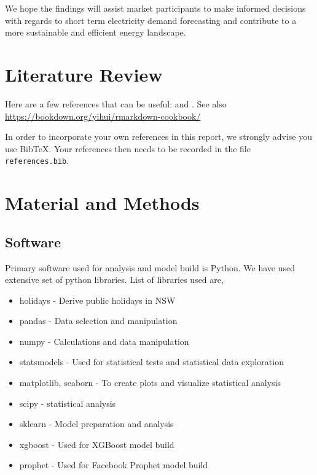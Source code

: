 \documentclass[mstat,12pt]{unswthesis}
\begin{document}
We hope the findings will assist market participants to make informed
decisions with regards to short term electricity demand forecasting and
contribute to a more sustainable and efficient energy landscape.

\chapter{Literature Review}\label{literature-review}

Here are a few references that can be useful: \cite{Xie2018} and
\cite{Lafaye2013}. See also
\url{https://bookdown.org/yihui/rmarkdown-cookbook/}

\bigskip

In order to incorporate your own references in this report, we strongly
advise you use BibTeX. Your references then needs to be recorded in the
file \texttt{references.bib}.

\chapter{Material and Methods}\label{material-and-methods}

\section{Software}\label{software}

Primary software used for analysis and model build is Python. We have
used extensive set of python libraries. List of libraries used are,

\begin{itemize}
  \item holidays - Derive public holidays in NSW 
  \item pandas - Data selection and manipulation
  \item numpy - Calculations and data manipulation
  \item statsmodels - Used for statistical tests and statistical data exploration
  \item matplotlib, seaborn - To create plots and visualize statistical analysis
  \item scipy - statistical analysis
  \item sklearn - Model preparation and analysis
  \item xgboost - Used for XGBoost model build
  \item prophet - Used for Facebook Prophet model build
\end{itemize}
\end{document}
